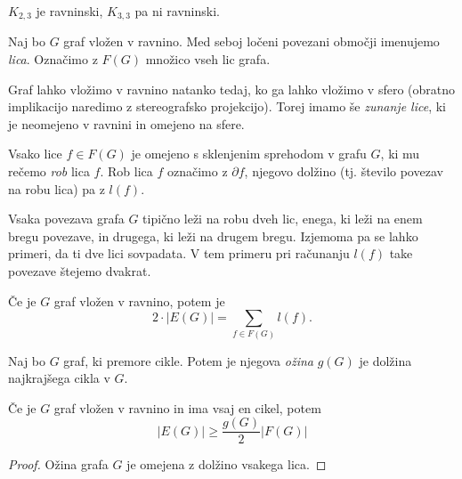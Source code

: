 \begin{primer}
    $K_{2,3}$ je ravninski, $K_{3,3}$ pa ni ravninski.
\end{primer}

\begin{definicija}
    Naj bo $G$ graf vložen v ravnino. Med seboj ločeni povezani območji imenujemo \emph{lica}. Označimo z $F(G)$ množico vseh lic grafa.
\end{definicija}

\begin{opomba}
    Graf lahko vložimo v ravnino natanko tedaj, ko ga lahko vložimo v sfero (obratno implikacijo naredimo z stereografsko projekcijo). Torej imamo še \emph{zunanje lice}, ki je neomejeno v ravnini in omejeno na sfere.
\end{opomba}

\begin{definicija}
    Vsako lice $f \in F(G)$ je omejeno s sklenjenim sprehodom v grafu $G$, ki mu rečemo \emph{rob} lica $f$. Rob lica $f$ označimo z $\partial f$, njegovo dolžino (tj. število povezav na robu lica) pa z $l(f)$.
\end{definicija}

\begin{opomba}
    Vsaka povezava grafa $G$ tipično leži na robu dveh lic, enega, ki leži na enem bregu povezave, in drugega, ki leži na drugem bregu. Izjemoma pa se lahko primeri, da ti dve lici sovpadata. V tem primeru pri računanju $l(f)$ take povezave štejemo dvakrat.
\end{opomba}

\begin{trditev}
    Če je $G$ graf vložen v ravnino, potem je $$2 \cdot |E(G)| = \sum_{f \in F(G)} l(f).$$
\end{trditev}

\begin{definicija}
    Naj bo $G$ graf, ki premore cikle. Potem je njegova \emph{ožina} $g(G)$ je dolžina najkrajšega cikla v $G$.
\end{definicija}

\begin{trditev}
    Če je $G$ graf vložen v ravnino in ima vsaj en cikel, potem 
    $$|E(G)| \geq \frac{g(G)}{2}|F(G)|$$
\end{trditev}

\begin{proof}
    Ožina grafa $G$ je omejena z dolžino vsakega lica.
\end{proof}

